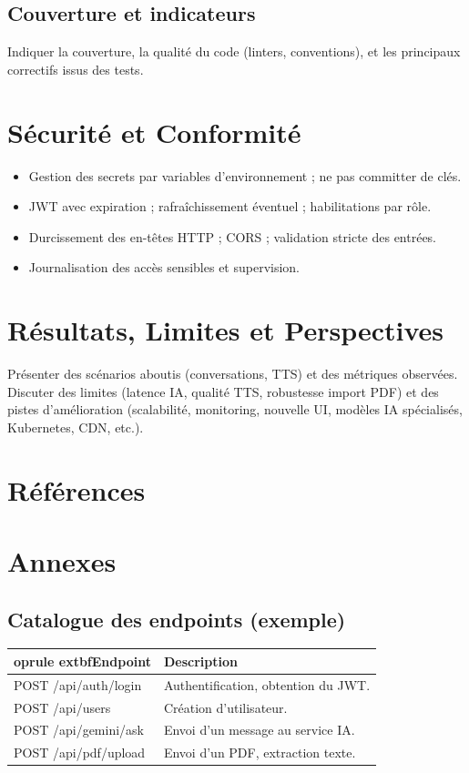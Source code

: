 \documentclass[12pt,a4paper]{report}
\begin{document}
\section{Couverture et indicateurs}
Indiquer la couverture, la qualité du code (linters, conventions), et les principaux correctifs issus des tests.

\chapter{Sécurité et Conformité}
\begin{itemize}[leftmargin=*,nosep]
  \item Gestion des secrets par variables d'environnement ; ne pas committer de clés.
  \item JWT avec expiration ; rafraîchissement éventuel ; habilitations par rôle.
  \item Durcissement des en-têtes HTTP ; CORS ; validation stricte des entrées.
  \item Journalisation des accès sensibles et supervision.
\end{itemize}

\chapter{Résultats, Limites et Perspectives}
Présenter des scénarios aboutis (conversations, TTS) et des métriques observées. Discuter des limites (latence IA, qualité TTS, robustesse import PDF) et des pistes d'amélioration (scalabilité, monitoring, nouvelle UI, modèles IA spécialisés, Kubernetes, CDN, etc.).

\clearpage
\chapter*{Références}
\nocite{*}



\appendix
\chapter{Annexes}
\section{Catalogue des endpoints (exemple)}
\begin{longtable}{p{5cm} p{8.5cm}}
	oprule
	extbf{Endpoint} & \textbf{Description}\\\midrule\endhead
POST /api/auth/login & Authentification, obtention du JWT.\\
POST /api/users & Création d'utilisateur.\\
POST /api/gemini/ask & Envoi d'un message au service IA.\\
POST /api/pdf/upload & Envoi d'un PDF, extraction texte.\\
\bottomrule
\end{longtable}
\end{document}
